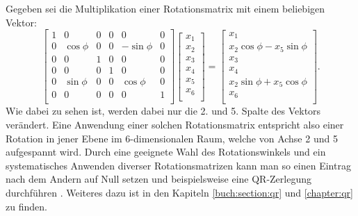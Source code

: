 \begin{beispiel}
Gegeben sei die Multiplikation einer Rotationsmatrix mit einem beliebigen Vektor:
	\begin{equation}
	\begin{bmatrix}
	1 & 0 & 0 & 0 & 0 & 0 \\
	0 & \cos\phi & 0 & 0 & -\sin\phi & 0 \\
	0 & 0 & 1 & 0 & 0 & 0 \\
	0 & 0 & 0 & 1 & 0 & 0 \\
	0 & \sin\phi & 0 & 0 & \cos\phi & 0 \\
	0 & 0 & 0 & 0 & 0 & 1 \\
	\end{bmatrix}
	\begin{bmatrix}
	x_{1}\\
	x_{2}\\
	x_{3}\\
	x_{4}\\
	x_{5}\\
	x_{6}\\
	\end{bmatrix}
	=
	\begin{bmatrix}
	x_{1}\\
	x_{2}\cos\phi-x_{5}\sin\phi\\
	x_{3}\\
	x_{4}\\
	x_{2}\sin\phi+x_{5}\cos\phi\\
	x_{6}\\
	\end{bmatrix}.
	\end{equation}	
Wie dabei zu sehen ist, werden dabei nur die 2. und 5. Spalte des Vektors verändert.
Eine Anwendung einer solchen Rotationsmatrix entspricht also einer Rotation in jener Ebene im 6-dimensionalen Raum, welche von Achse 2 und 5 aufgespannt wird.
Durch eine geeignete Wahl des Rotationswinkels und ein systematisches Anwenden diverser Rotationsmatrizen kann man so einen Eintrag nach dem Andern auf Null setzen und beispielsweise eine QR-Zerlegung durchführen
\cite{francis:QR_Zerlegung}.
Weiteres dazu ist in den Kapiteln \ref{buch:section:qr} und \ref{chapter:qr} zu finden.
\end{beispiel}

